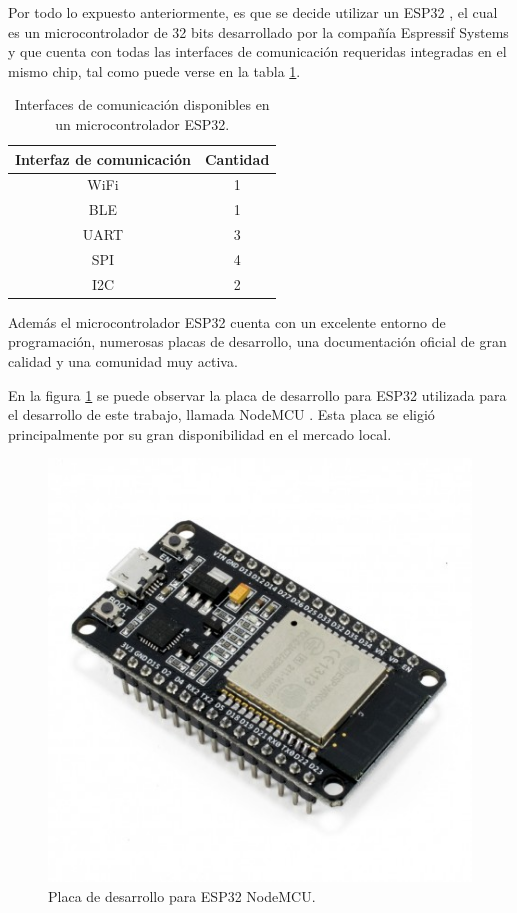 Por todo lo expuesto anteriormente, es que se decide utilizar un ESP32 \citep{esp32_overview}, el cual es un microcontrolador de 32 bits desarrollado por la compañía Espressif Systems y que cuenta con todas las interfaces de comunicación requeridas integradas en el mismo chip, tal como puede verse en la tabla \ref{tab:esp32_interfaces}.

\begin{table}[h]
	\centering
	\caption{Interfaces de comunicación disponibles en un microcontrolador ESP32.}
	\begin{tabular}{c c}    
		\toprule
		\textbf{Interfaz de comunicación}	& \textbf{Cantidad}	\\
		\midrule
		WiFi								& 1					\\
		BLE									& 1					\\
		UART 								& 3					\\		
		SPI	 								& 4					\\
		I2C	 								& 2					\\
		\bottomrule
		\hline
	\end{tabular}
	\label{tab:esp32_interfaces}
\end{table}

Además el microcontrolador ESP32 cuenta con un excelente entorno de programación, numerosas placas de desarrollo, una documentación oficial de gran calidad y una comunidad muy activa.

En la figura \ref{fig:nodemcu_esp32} se puede observar la placa de desarrollo para ESP32 utilizada para el desarrollo de este trabajo, llamada NodeMCU \citep{esp32_nodemcu}. Esta placa se eligió principalmente por su gran disponibilidad en el mercado local.

\begin{figure}[h]
\centering
\includegraphics[scale=0.4]{./Figures/nodemcu_esp32.jpg}
\caption[Placa de desarrollo para ESP32 NodeMCU.]{Placa de desarrollo para ESP32 NodeMCU.\footnotemark}
\label{fig:nodemcu_esp32}
\end{figure}

